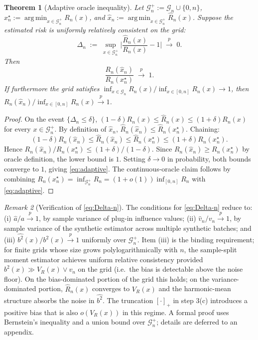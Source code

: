 \documentclass[11pt]{article}
\theoremstyle{plain}
\newtheorem{theorem}{Theorem}[section]
\theoremstyle{definition}
\theoremstyle{remark}
\newtheorem{remark}[theorem]{Remark}
\DeclareMathOperator*{\argmin}{arg\,min}
\begin{document}
\begin{theorem}[Adaptive oracle inequality]\label{thm:adaptive}
Let $\mathcal{G}_n^+:=\mathcal{G}_n\cup\{0,n\}$, $x_n^\star:=\argmin_{x\in\mathcal{G}_n^+}R_n(x)$, and $\hat x_n:=\argmin_{x\in\mathcal{G}_n^+}\widehat R_n(x)$. Suppose the estimated risk is uniformly relatively consistent on the grid:
\begin{equation}\label{eq:Delta-n}
\Delta_n\;:=\;\sup_{x\in\mathcal{G}_n^+}\biggl|\frac{\widehat R_n(x)}{R_n(x)}-1\biggr|\;\stackrel{p}{\to}\;0.
\end{equation}
Then
\begin{equation}\label{eq:adaptive}
\frac{R_n(\hat x_n)}{R_n(x_n^\star)}\;\stackrel{p}{\to}\;1.
\end{equation}
If furthermore the grid satisfies $\inf_{x\in\mathcal{G}_n}R_n(x)/\inf_{x\in[0,n]}R_n(x)\to 1$, then $R_n(\hat x_n)/\inf_{x\in[0,n]}R_n(x)\stackrel{p}{\to}1$.
\end{theorem}

\begin{proof}
On the event $\{\Delta_n\le\delta\}$, $(1-\delta)R_n(x)\le\widehat R_n(x)\le(1+\delta)R_n(x)$ for every $x\in\mathcal{G}_n^+$. By definition of $\hat x_n$, $\widehat R_n(\hat x_n)\le\widehat R_n(x_n^\star)$. Chaining:
\begin{equation*}
(1-\delta)R_n(\hat x_n)\le\widehat R_n(\hat x_n)\le\widehat R_n(x_n^\star)\le(1+\delta)R_n(x_n^\star).
\end{equation*}
Hence $R_n(\hat x_n)/R_n(x_n^\star)\le(1+\delta)/(1-\delta)$. Since $R_n(\hat x_n)\ge R_n(x_n^\star)$ by oracle definition, the lower bound is $1$. Setting $\delta\to0$ in probability, both bounds converge to $1$, giving \cref{eq:adaptive}. The continuous-oracle claim follows by combining $R_n(x_n^\star)=\inf_{\mathcal{G}_n^+}R_n=(1+o(1))\inf_{[0,n]}R_n$ with \cref{eq:adaptive}.
\end{proof}

\begin{remark}[Verification of \cref{eq:Delta-n}]\label{rem:verify-delta}
The conditions for \cref{eq:Delta-n} reduce to: (i) $\hat a/a\stackrel{p}{\to}1$, by sample variance of plug-in influence values; (ii) $\hat v_n/v_n\stackrel{p}{\to}1$, by sample variance of the synthetic estimator across multiple synthetic batches; and (iii) $\widehat{b^2}(x)/b^2(x)\stackrel{p}{\to}1$ uniformly over $\mathcal{G}_n^+$. Item (iii) is the binding requirement; for finite grids whose size grows polylogarithmically with $n$, the sample-split moment estimator achieves uniform relative consistency provided $b^2(x)\gg V_R(x)\vee v_n$ on the grid (i.e.\ the bias is detectable above the noise floor). On the bias-dominated portion of the grid this holds; on the variance-dominated portion, $\widehat R_n(x)$ converges to $V_R(x)$ and the harmonic-mean structure absorbs the noise in $\widehat{b^2}$. The truncation $[\cdot]_+$ in step 3(c) introduces a positive bias that is also $o(V_R(x))$ in this regime. A formal proof uses Bernstein's inequality and a union bound over $\mathcal{G}_n^+$; details are deferred to an appendix.
\end{remark}
\end{document}
